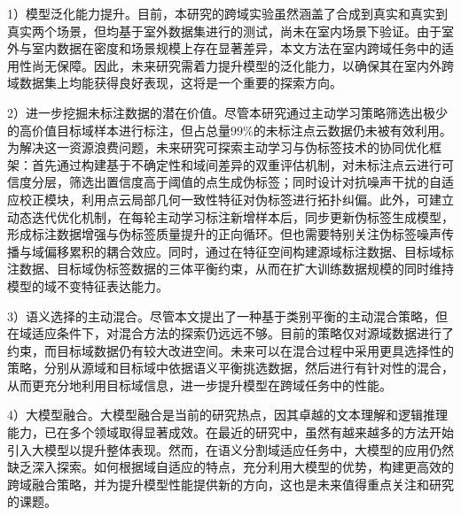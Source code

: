 1）模型泛化能力提升。目前，本研究的跨域实验虽然涵盖了合成到真实和真实到真实两个场景，但均基于室外数据集进行的测试，尚未在室内场景下验证。由于室外与室内数据在密度和场景规模上存在显著差异，本文方法在室内跨域任务中的适用性尚无保障。因此，未来研究需着力提升模型的泛化能力，以确保其在室内外跨域数据集上均能获得良好表现，这将是一个重要的探索方向。

2）进一步挖掘未标注数据的潜在价值。尽管本研究通过主动学习策略筛选出极少的高价值目标域样本进行标注，但占总量99\%的未标注点云数据仍未被有效利用。为解决这一资源浪费问题，未来研究可探索主动学习与伪标签技术的协同优化框架：首先通过构建基于不确定性和域间差异的双重评估机制，对未标注点云进行可信度分层，筛选出置信度高于阈值的点生成伪标签；同时设计对抗噪声干扰的自适应校正模块，利用点云局部几何一致性特征对伪标签进行拓扑纠偏。此外，可建立动态迭代优化机制，在每轮主动学习标注新增样本后，同步更新伪标签生成模型，形成标注数据增强与伪标签质量提升的正向循环。但也需要特别关注伪标签噪声传播与域偏移累积的耦合效应。同时，通过在特征空间构建源域标注数据、目标域标注数据、目标域伪标签数据的三体平衡约束，从而在扩大训练数据规模的同时维持模型的域不变特征表达能力。

3）语义选择的主动混合。尽管本文提出了一种基于类别平衡的主动混合策略，但在域适应条件下，对混合方法的探索仍远远不够。目前的策略仅对源域数据进行了约束，而目标域数据仍有较大改进空间。未来可以在混合过程中采用更具选择性的策略，分别从源域和目标域中依据语义平衡挑选数据，然后进行有针对性的混合，从而更充分地利用目标域信息，进一步提升模型在跨域任务中的性能。

4）大模型融合。大模型融合是当前的研究热点，因其卓越的文本理解和逻辑推理能力，已在多个领域取得显著成效。在最近的研究中，虽然有越来越多的方法开始引入大模型以提升整体表现。然而，在语义分割域适应任务中，大模型的应用仍然缺乏深入探索。如何根据域自适应的特点，充分利用大模型的优势，构建更高效的跨域融合策略，并为提升模型性能提供新的方向，这也是未来值得重点关注和研究的课题。
